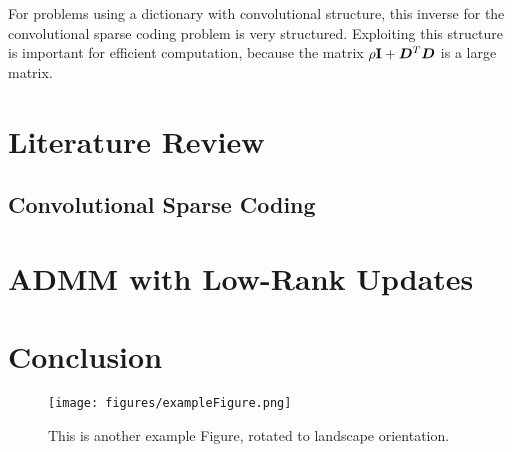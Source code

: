 For problems using a dictionary with convolutional structure, this inverse for the convolutional sparse coding problem is very structured. Exploiting this structure is important for efficient computation, because the matrix $\rho{\bf I} + \bm{D}^T\bm{D}$ is a large matrix.


\section{Literature Review}
\subsection{Convolutional Sparse Coding}
\section{ADMM with Low-Rank Updates}
\section{Conclusion}

\begin{sidewaysfigure}
\texttt{[image: figures/exampleFigure.png]}
\caption{This is another example Figure, rotated to landscape orientation.}
\label{LandscapeFigure}
\end{sidewaysfigure}
